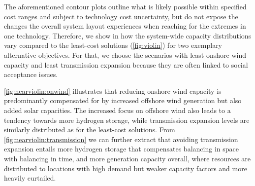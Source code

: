 The aforementioned contour plots  outline
what is likely possible within specified cost ranges and subject to technology cost uncertainty,
but do not expose
the changes the overall system layout experiences when reaching for the extremes in one technology.
Therefore, we show in  how the system-wide capacity distributions vary
compared to the least-cost solutions (\cref{fig:violin}) for two exemplary alternative objectives.
For that, we choose the scenarios with least onshore wind capacity and least transmission expansion
because they are often linked to social acceptance issues.

\cref{fig:nearviolin:onwind} illustrates that reducing onshore wind capacity is
predominantly compensated for by increased offshore wind generation but also added solar capacities.
The increased focus on offshore wind also leads to a tendency towards more hydrogen storage,
while transmission expansion levels are similarly distributed as for the least-cost solutions.
From \cref{fig:nearviolin:transmission} we can further extract that avoiding transmission expansion entails
more hydrogen storage that compensates balancing in space with balancing in time,
and more generation capacity overall, where resources are distributed to locations with
high demand but weaker capacity factors and more heavily curtailed.



